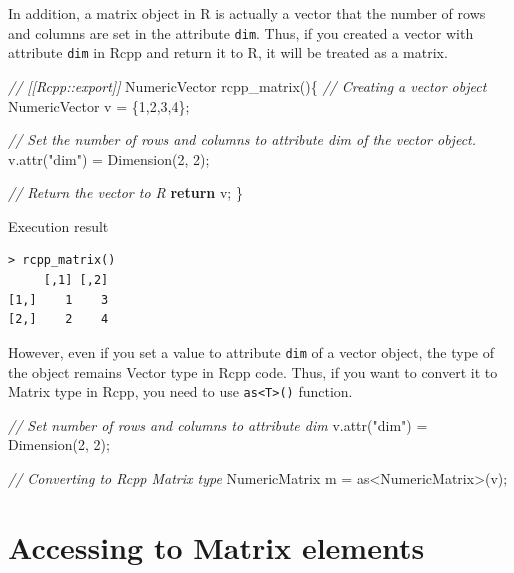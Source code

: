 \documentclass[]{book}
\newenvironment{Shaded}{\begin{snugshade}}{\end{snugshade}}
\newcommand{\DecValTok}[1]{\textcolor[rgb]{0.00,0.00,0.81}{#1}}
\newcommand{\StringTok}[1]{\textcolor[rgb]{0.31,0.60,0.02}{#1}}
\newcommand{\CommentTok}[1]{\textcolor[rgb]{0.56,0.35,0.01}{\textit{#1}}}
\newcommand{\ControlFlowTok}[1]{\textcolor[rgb]{0.13,0.29,0.53}{\textbf{#1}}}
\newcommand{\NormalTok}[1]{#1}
\theoremstyle{definition}
\theoremstyle{definition}
\theoremstyle{remark}
\begin{document}
In addition, a matrix object in R is actually a vector that the number
of rows and columns are set in the attribute \texttt{dim}. Thus, if you
created a vector with attribute \texttt{dim} in Rcpp and return it to R,
it will be treated as a matrix.

\begin{Shaded}
\begin{Highlighting}[]
\CommentTok{// [[Rcpp::export]]}
\NormalTok{NumericVector rcpp_matrix()\{}
    \CommentTok{// Creating a vector object}
\NormalTok{    NumericVector v = \{}\DecValTok{1}\NormalTok{,}\DecValTok{2}\NormalTok{,}\DecValTok{3}\NormalTok{,}\DecValTok{4}\NormalTok{\};}

    \CommentTok{// Set the number of rows and columns to attribute dim of the vector object.}
\NormalTok{    v.attr(}\StringTok{"dim"}\NormalTok{) = Dimension(}\DecValTok{2}\NormalTok{, }\DecValTok{2}\NormalTok{);}

    \CommentTok{// Return the vector to R}
    \ControlFlowTok{return}\NormalTok{ v;}
\NormalTok{\}}
\end{Highlighting}
\end{Shaded}

Execution result

\begin{verbatim}
> rcpp_matrix()
     [,1] [,2]
[1,]    1    3
[2,]    2    4
\end{verbatim}

However, even if you set a value to attribute \texttt{dim} of a vector
object, the type of the object remains Vector type in Rcpp code. Thus,
if you want to convert it to Matrix type in Rcpp, you need to use
\texttt{as\textless{}T\textgreater{}()} function.

\begin{Shaded}
\begin{Highlighting}[]
\CommentTok{// Set number of rows and columns to attribute dim}
\NormalTok{v.attr(}\StringTok{"dim"}\NormalTok{) = Dimension(}\DecValTok{2}\NormalTok{, }\DecValTok{2}\NormalTok{);}

\CommentTok{// Converting to Rcpp Matrix type}
\NormalTok{NumericMatrix m = as<NumericMatrix>(v);}
\end{Highlighting}
\end{Shaded}

\section{Accessing to Matrix
elements}\label{accessing-to-matrix-elements}
\end{document}
